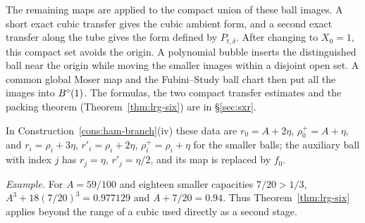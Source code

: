 The remaining maps are applied to the compact union of these ball images.
A short exact cubic transfer gives the cubic ambient form, and a second exact transfer
along the tube gives the form defined by $P_{t,\delta}$.
After changing to $X_0=1$, this compact set avoids the origin.
A polynomial bubble inserts the distinguished ball near the origin while moving the
smaller images within a disjoint open set. A common global Moser map and the
Fubini--Study ball chart then put all the images into $B^{\circ}(1)$.
The formulas, the two compact transfer estimates and the packing theorem (Theorem~\ref{thm:lrg-six}) are in
\S\ref{sec:sxr}.

In Construction~\ref{cons:ham-branch}(iv) these data are $r_0=A+2\eta$, $\rho_0^+=A+\eta$, and $r_i=\rho_i+3\eta$,
$r'_i=\rho_i+2\eta$, $\rho_i^+=\rho_i+\eta$ for the smaller balls; the auxiliary ball with index $j$ has $r_j=\eta$,
$r'_j=\eta/2$, and its map is replaced by $f_0$.

\emph{Example.}
For $A=59/100$ and eighteen smaller capacities $7/20>1/3$,
$A^3+18(7/20)^3=0.977129$ and $A+7/20=0.94$.
Thus Theorem~\ref{thm:lrg-six} applies beyond the range of a cubic used directly as a second stage.
